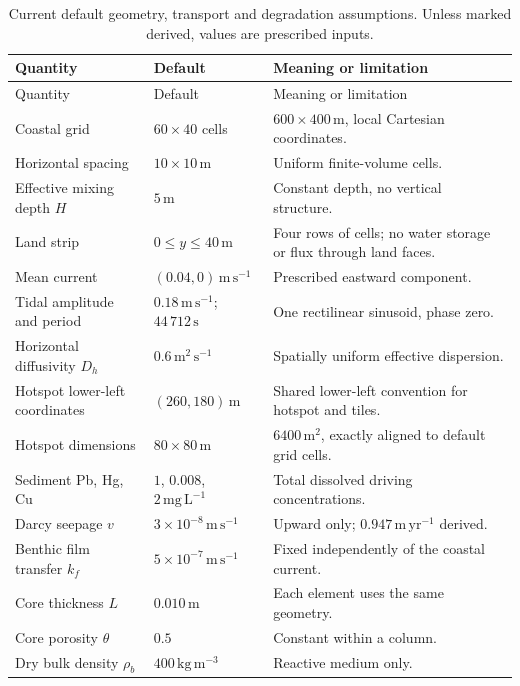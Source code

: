 \begin{longtable}{@{}p{}p{}p{}@{}}
\caption{Current default geometry, transport and degradation assumptions. Unless marked derived, values are prescribed inputs.}\label{tab:physical_defaults}\\
\toprule Quantity & Default & Meaning or limitation \\
\midrule\endfirsthead
\toprule Quantity & Default & Meaning or limitation \\
\midrule\endhead
\bottomrule\endfoot
Coastal grid & $60\times40$ cells & $600\times400\,\mathrm{m}$, local Cartesian coordinates. \\
Horizontal spacing & $10\times10\,\mathrm{m}$ & Uniform finite-volume cells. \\
Effective mixing depth $H$ & $5\,\mathrm{m}$ & Constant depth, no vertical structure. \\
Land strip & $0\leq y\leq40\,\mathrm{m}$ & Four rows of cells; no water storage or flux through land faces. \\
Mean current & $(0.04,0)\,\mathrm{m\,s^{-1}}$ & Prescribed eastward component. \\
Tidal amplitude and period & $0.18\,\mathrm{m\,s^{-1}}$; $44\,712\,\mathrm{s}$ & One rectilinear sinusoid, phase zero. \\
Horizontal diffusivity $D_h$ & $0.6\,\mathrm{m^2\,s^{-1}}$ & Spatially uniform effective dispersion. \\
Hotspot lower-left coordinates & $(260,180)\,\mathrm{m}$ & Shared lower-left convention for hotspot and tiles. \\
Hotspot dimensions & $80\times80\,\mathrm{m}$ & $6400\,\mathrm{m^2}$, exactly aligned to default grid cells. \\
Sediment Pb, Hg, Cu & $1$, $0.008$, $2\,\mathrm{mg\,L^{-1}}$ & Total dissolved driving concentrations. \\
Darcy seepage $v$ & $3\times10^{-8}\,\mathrm{m\,s^{-1}}$ & Upward only; $0.947\,\mathrm{m\,yr^{-1}}$ derived. \\
Benthic film transfer $k_f$ & $5\times10^{-7}\,\mathrm{m\,s^{-1}}$ & Fixed independently of the coastal current. \\
Core thickness $L$ & $0.010\,\mathrm{m}$ & Each element uses the same geometry. \\
Core porosity $\theta$ & $0.5$ & Constant within a column. \\
Dry bulk density $\rho_b$ & $400\,\mathrm{kg\,m^{-3}}$ & Reactive medium only. \\

\end{longtable}
